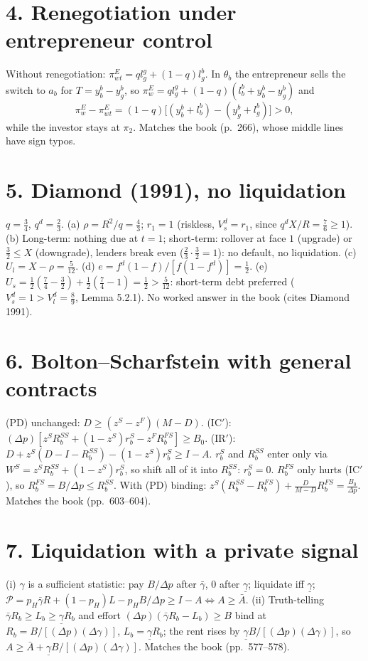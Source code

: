 \documentclass[11pt,a4paper]{article}
\begin{document}
\section*{4. Renegotiation under entrepreneur control}
Without renegotiation: $\pi^E_{wt}=ql^g_g+(1-q)l^b_g$. In $\theta_b$ the entrepreneur sells the switch to
$a_b$ for $T=y^b_b-y^b_g$, so $\pi^E_w=ql^g_g+(1-q)(l^b_b+y^b_b-y^b_g)$ and
$$\pi^E_w-\pi^E_{wt}=(1-q)\bigl[(y^b_b+l^b_b)-(y^b_g+l^b_g)\bigr]>0,$$
while the investor stays at $\pi_2$. Matches the book (p.~266), whose middle lines have sign typos.

\section*{5. Diamond (1991), no liquidation}
$q=\tfrac34$, $q^d=\tfrac23$. (a) $\rho=R^2/q=\tfrac43$; $r_1=1$ (riskless, $V_s^d=r_1$, since
$q^dX/R=\tfrac76\geq1$). (b) Long-term: nothing due at $t=1$; short-term: rollover at face $1$
(upgrade) or $\tfrac32\leq X$ (downgrade), lenders break even ($\tfrac23\cdot\tfrac32=1$): no default, no
liquidation. (c) $U_l=X-\rho=\tfrac5{12}$. (d) $e=f^d(1-f)/[f(1-f^d)]=\tfrac12$.
(e) $U_s=\tfrac12(\tfrac74-\tfrac32)+\tfrac12(\tfrac74-1)=\tfrac12>\tfrac5{12}$: short-term debt preferred
($V_s^d=1>V_l^d=\tfrac89$, Lemma 5.2.1). No worked answer in the book (cites Diamond 1991).

\section*{6. Bolton--Scharfstein with general contracts}
(PD) unchanged: $D\geq(z^S-z^F)(M-D)$. (IC$'$): $(\Delta p)[z^SR_b^{SS}+(1-z^S)r_b^S-z^FR_b^{FS}]\geq B_0$.
(IR$'$): $D+z^S(D-I-R_b^{SS})-(1-z^S)r_b^S\geq I-A$. $r_b^S$ and $R_b^{SS}$ enter only via
$W^S=z^SR_b^{SS}+(1-z^S)r_b^S$, so shift all of it into $R_b^{SS}$: $r_b^S=0$. $R_b^{FS}$ only hurts
(IC$'$), so $R_b^{FS}=B/\Delta p\leq R_b^{SS}$. With (PD) binding:
$z^S(R_b^{SS}-R_b^{FS})+\frac{D}{M-D}R_b^{FS}=\frac{B_0}{\Delta p}$. Matches the book (pp.~603--604).

\section*{7. Liquidation with a private signal}
(i) $\gamma$ is a sufficient statistic: pay $B/\Delta p$ after $\bar\gamma$, $0$ after $\underline\gamma$;
liquidate iff $\underline\gamma$; $\mathcal P=p_H\bar\gamma R+(1-p_H)L-p_HB/\Delta p\geq I-A\iff A\geq\bar A$.
(ii) Truth-telling $\bar\gamma R_b\geq L_b\geq\underline\gamma R_b$ and effort $(\Delta p)(\bar\gamma R_b-L_b)\geq B$
bind at $R_b=B/[(\Delta p)(\Delta\gamma)]$, $L_b=\underline\gamma R_b$; the rent rises by
$\underline\gamma B/[(\Delta p)(\Delta\gamma)]$, so $A\geq\bar A+\underline\gamma B/[(\Delta p)(\Delta\gamma)]$.
Matches the book (pp.~577--578).
\end{document}
